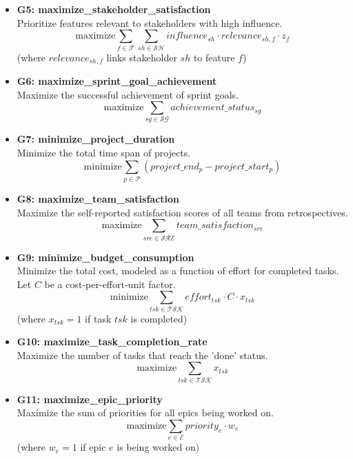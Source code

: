 \documentclass[11pt]{article}
\begin{document}
\begin{itemize}
    \item \textbf{G5: maximize\_stakeholder\_satisfaction} \\
    Prioritize features relevant to stakeholders with high influence.
    $$ \text{maximize} \sum_{f \in \mathcal{F}} \sum_{sh \in \mathcal{SH}} influence_{sh} \cdot relevance_{sh,f} \cdot z_{f} $$
    (where $relevance_{sh,f}$ links stakeholder $sh$ to feature $f$)
    
    \item \textbf{G6: maximize\_sprint\_goal\_achievement} \\
    Maximize the successful achievement of sprint goals.
    $$ \text{maximize} \sum_{sg \in \mathcal{SG}} achievement\_status_{sg} $$

    \item \textbf{G7: minimize\_project\_duration} \\
    Minimize the total time span of projects.
    $$ \text{minimize} \sum_{p \in \mathcal{P}} (project\_end_p - project\_start_p) $$

    \item \textbf{G8: maximize\_team\_satisfaction} \\
    Maximize the self-reported satisfaction scores of all teams from retrospectives.
    $$ \text{maximize} \sum_{sre \in \mathcal{SRE}} team\_satisfaction_{sre} $$

    \item \textbf{G9: minimize\_budget\_consumption} \\
    Minimize the total cost, modeled as a function of effort for completed tasks. Let $C$ be a cost-per-effort-unit factor.
    $$ \text{minimize} \sum_{tsk \in \mathcal{TSK}} effort_{tsk} \cdot C \cdot x_{tsk} $$
    (where $x_{tsk}=1$ if task $tsk$ is completed)
    
    \item \textbf{G10: maximize\_task\_completion\_rate} \\
    Maximize the number of tasks that reach the 'done' status.
    $$ \text{maximize} \sum_{tsk \in \mathcal{TSK}} x_{tsk} $$

    \item \textbf{G11: maximize\_epic\_priority} \\
    Maximize the sum of priorities for all epics being worked on.
    $$ \text{maximize} \sum_{e \in \mathcal{E}} priority_e \cdot w_{e} $$
    (where $w_{e}=1$ if epic $e$ is being worked on)
\end{itemize}

\end{document}
